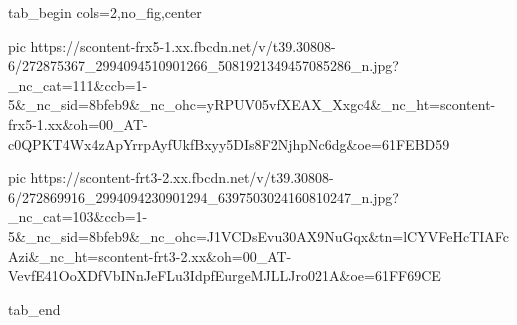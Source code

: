  
 
 
 
 


\ifcmt
  tab_begin cols=2,no_fig,center

     pic https://scontent-frx5-1.xx.fbcdn.net/v/t39.30808-6/272875367_2994094510901266_5081921349457085286_n.jpg?_nc_cat=111&ccb=1-5&_nc_sid=8bfeb9&_nc_ohc=yRPUV05vfXEAX_Xxgc4&_nc_ht=scontent-frx5-1.xx&oh=00_AT-c0QPKT4Wx4zApYrrpAyfUkfBxyy5DIs8F2NjhpNc6dg&oe=61FEBD59

     pic https://scontent-frt3-2.xx.fbcdn.net/v/t39.30808-6/272869916_2994094230901294_6397503024160810247_n.jpg?_nc_cat=103&ccb=1-5&_nc_sid=8bfeb9&_nc_ohc=J1VCDsEvu30AX9NuGqx&tn=lCYVFeHcTIAFcAzi&_nc_ht=scontent-frt3-2.xx&oh=00_AT-VevfE41OoXDfVbINnJeFLu3IdpfEurgeMJLLJro021A&oe=61FF69CE

  tab_end
\fi
